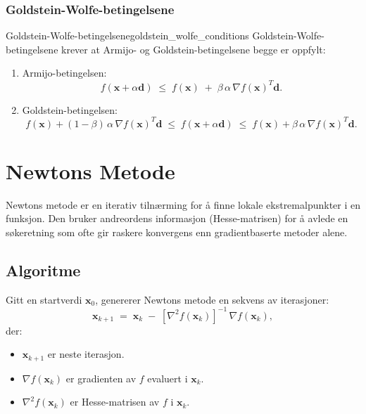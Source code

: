 \subsubsection{Goldstein-Wolfe-betingelsene}
\begin{definition}{Goldstein-Wolfe-betingelsene}{goldstein_wolfe_conditions}
  Goldstein-Wolfe-betingelsene krever at Armijo- og Goldstein-betingelsene begge er oppfylt:
  \begin{enumerate}
    \item Armijo-betingelsen:
          \[
            f(\symbf{x} + \alpha \symbf{d}) 
            \;\le\; 
            f(\symbf{x}) 
            \;+\; 
            \beta\,\alpha\,\nabla f(\symbf{x})^T \symbf{d}.
          \]
    \item Goldstein-betingelsen:
          \[
            f(\symbf{x}) + (1-\beta)\,\alpha\,\nabla f(\symbf{x})^T \symbf{d} 
            \;\le\; 
            f(\symbf{x} + \alpha \symbf{d}) 
            \;\le\; 
            f(\symbf{x}) + \beta\,\alpha\,\nabla f(\symbf{x})^T \symbf{d}.
          \]
  \end{enumerate}
\end{definition}

\section{Newtons Metode}
\label{sec:newtons_method}

Newtons metode er en iterativ tilnærming for å finne lokale ekstremalpunkter i en funksjon. Den bruker andreordens informasjon (Hesse-matrisen) for å avlede en søkeretning som ofte gir raskere konvergens enn gradientbaserte metoder alene.

\subsection{Algoritme}
Gitt en startverdi \( \symbf{x}_0 \), genererer Newtons metode en sekvens av iterasjoner:
\[
  \symbf{x}_{k+1} 
  \;=\; 
  \symbf{x}_k 
  \;-\; 
  [\nabla^2 f(\symbf{x}_k)]^{-1} \,\nabla f(\symbf{x}_k),
\]
der:
\begin{itemize}
  \item \(\symbf{x}_{k+1}\) er neste iterasjon.
  \item \(\nabla f(\symbf{x}_k)\) er gradienten av \(f\) evaluert i \(\symbf{x}_k\).
  \item \(\nabla^2 f(\symbf{x}_k)\) er Hesse-matrisen av \(f\) i \(\symbf{x}_k\).
\end{itemize}

